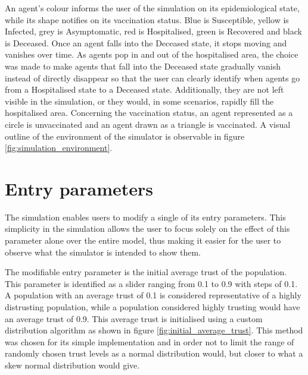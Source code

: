 An agent's colour informs the user of the simulation on its epidemiological state, while its shape notifies on its vaccination status. Blue is Susceptible, yellow is Infected, grey is Asymptomatic, red is Hospitalised, green is Recovered and black is Deceased. Once an agent falls into the Deceased state, it stops moving and vanishes over time. As agents pop in and out of the hospitalised area, the choice was made to make agents that fall into the Deceased state gradually vanish instead of directly disappear so that the user can clearly identify when agents go from a Hospitalised state to a Deceased state. Additionally, they are not left visible in the simulation, or they would, in some scenarios, rapidly fill the hospitalised area. Concerning the vaccination status, an agent represented as a circle is unvaccinated and an agent drawn as a triangle is vaccinated.
A visual outline of the environment of the simulator is observable in figure \ref{fig:simulation_environment}.


\section{Entry parameters}
\label{entry_parameters}

The simulation enables users to modify a single of its entry parameters. This simplicity in the simulation allows the user to focus solely on the effect of this parameter alone over the entire model, thus making it easier for the user to observe what the simulator is intended to show them.

The modifiable entry parameter is the initial average trust of the population. This parameter is identified as a slider ranging from 0.1 to 0.9 with steps of 0.1. A population with an average trust of 0.1 is considered representative of a highly distrusting population, while a population considered highly trusting would have an average trust of 0.9. This average trust is initialised using a custom distribution algorithm as shown in figure \ref{fig:initial_average_trust}. This method was chosen for its simple implementation and in order not to limit the range of randomly chosen trust levels as a normal distribution would, but closer to what a skew normal distribution would give.

